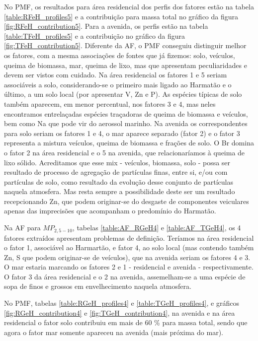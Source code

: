 No PMF, os resultados para área residencial dos perfis dos fatores estão na 
tabela \ref{table:RFeH_profiles5} e a contribuição para massa total no gráfico 
da figura \ref{fig:RFeH_contribution5}. Para a avenida, os perfis estão na 
tabela \ref{table:TFeH_profiles5} e a contribuição no gráfico da figura 
\ref{fig:TFeH_contribution5}. Diferente da AF, o PMF conseguiu distinguir melhor
os fatores, com a mesma associações de fontes que já fizemos: solo, veículos, 
queima de biomassa, mar, queima de lixo, mas que apresentam peculiaridades e 
devem ser vistos com cuidado. Na área residencial os fatores 1 e 5 seriam 
associáveis a solo, considerando-se o primeiro mais ligado ao Harmatão e o 
último, a um solo local (por apresentar V, Zn e P). As espécies típicas de solo 
também aparecem, em menor percentual, nos fatores 3 e 4, mas neles encontramos 
entrelaçadas espécies traçadoras de queima de biomassa e veículos, bem como Na 
que pode vir do aerossol marinho. 
Na avenida os correspondentes para solo seriam os fatores 1 e 4, o mar aparece 
separado (fator 2) e o fator 3 representa a mistura veículos, queima de biomassa
e frações de solo. O Br domina o fator 2 na área residencial e o 5 na avenida, 
que relacionaríamos à queima de lixo sólido. Acreditamos que esse mix - 
veículos, biomassa, solo - possa ser resultado de processo de agregação de 
partículas finas, entre si, e/ou com partículas de solo, como resultado da 
evolução desse conjunto de partículas naquela atmosfera. Mas resta sempre a 
possibilidade deste ser um resultado recepcionando Zn, que podem originar-se do 
desgaste de componentes veiculares apenas das imprecisões que acompanham o 
predomínio do Harmatão.

Na AF para $MP_{2,5-10}$, tabelas \ref{table:AF_RGeH4} e \ref{table:AF_TGeH4}, 
os 4 fatores extraídos apresentam problemas de definição. Teríamos na área 
residencial o fator 1, associável ao Harmartão, e fator 4, ao solo local 
(mas contendo também Zn, S que podem originar-se de veículos), que na avenida 
seriam os fatores 4 e 3. O mar estaria marcando os fatores 2 e 1 - residencial 
e avenida - respectivamente. O fator 3 da área residencial e o 2 na avenida, 
assemelham-se a uma espécie de sopa de finos e grossos em envelhecimento naquela
atmosfera.

 No PMF, tabelas 
\ref{table:RGeH_profiles4} e \ref{table:TGeH_profiles4}, e gráficos 
\ref{fig:RGeH_contribution4} e \ref{fig:TGeH_contribution4}, na avenida e na
área residencial o fator solo contribuiu em mais de 60 \% para massa total, 
sendo que agora o fator mar somente apareceu na avenida (mais próxima do mar).

